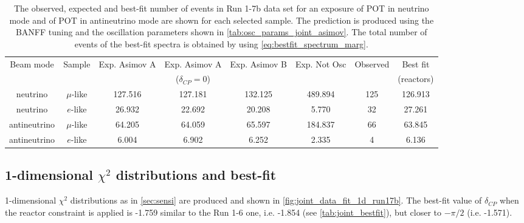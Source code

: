 \begin{table}[htb]
\centering
\begin{tabular}{| c | c | c | c | c | c | c | c |}
\hline
Beam mode	& Sample		& Exp. Asimov A  	& Exp. Asimov A	& Exp. Asimov B	& Exp. Not Osc			& Observed 	& Best fit\\
			& 			& 			  	& ($\delta_{CP}=0$)	& 				& 					& 		 	& (reactors) \\
\hline
neutrino	 	& $\mu$-like 	&127.516			& 127.181			& 132.125	 		& 489.894				& 125 		& 126.913 \\
neutrino 		& $e$-like  	& 26.932 			& 22.692			& 20.208			& 5.770				& 32 			& 27.261 \\
antineutrino 	& $\mu$-like 	& 64.205			& 64.059			& 65.597			& 184.837				& 66 			& 63.845 \\
antineutrino 	& $e$-like 	& 6.004			& 6.902			& 6.252			& 2.335				& 4 			& 6.136 \\
\hline
\end{tabular}
\caption{
The observed, expected and best-fit number of events in Run 1-7b data set
for an exposure
of \TotalPotNuRunOneSevenB POT in neutrino mode
and
of \TotalPotNuBarRunOneSevenB POT in antineutrino mode
are shown 
for each selected sample.
The prediction is produced using the BANFF tuning
and the oscillation parameters shown in \cref{tab:osc_params_joint_asimov}.
The total number of events of the best-fit spectra is obtained by using \cref{eq:bestfit_spectrum_marg}.
}
\label{tab:num_events_run17b}
\end{table}













%
%

\subsection {1-dimensional $\chi^2$ distributions and best-fit}
\label{sec:chisq_1d_run17b}



1-dimensional $\chi^2$ distributions as in \cref{sec:sensi} are produced
and shown in \cref{fig:joint_data_fit_1d_run17b}.
The best-fit value of $\delta_{CP}$ when the reactor constraint is applied is -1.759
similar to the Run 1-6 one, i.e. -1.854 (see \cref{tab:joint_bestfit}), but closer to $-\pi/2$ (i.e. -1.571).
 
